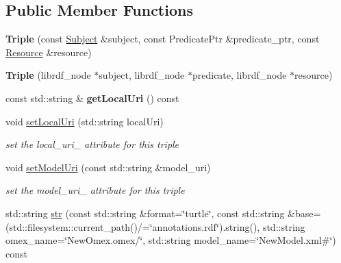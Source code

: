 \subsection*{Public Member Functions}
\begin{DoxyCompactItemize}
\item 
\mbox{\label{classomexmeta_1_1Triple_aaed857f9356dc3a7414f06f393a75ba0}} 
{\bfseries Triple} (const \hyperlink{classomexmeta_1_1Subject}{Subject} \&subject, const Predicate\+Ptr \&predicate\+\_\+ptr, const \hyperlink{classomexmeta_1_1Resource}{Resource} \&resource)
\item 
\mbox{\label{classomexmeta_1_1Triple_adc457c78ec059eb71602e7ea4f763582}} 
{\bfseries Triple} (librdf\+\_\+node $\ast$subject, librdf\+\_\+node $\ast$predicate, librdf\+\_\+node $\ast$resource)
\item 
\mbox{\label{classomexmeta_1_1Triple_a1cb45dd3a5778f0e0e92e4a185da9400}} 
const std\+::string \& {\bfseries get\+Local\+Uri} () const
\item 
\mbox{\label{classomexmeta_1_1Triple_a6694daa46597ea91dda045aa0d5e6cfc}} 
void \hyperlink{classomexmeta_1_1Triple_a6694daa46597ea91dda045aa0d5e6cfc}{set\+Local\+Uri} (std\+::string local\+Uri)
\begin{DoxyCompactList}\small\item\em set the local\+\_\+uri\+\_\+ attribute for this triple \end{DoxyCompactList}\item 
\mbox{\label{classomexmeta_1_1Triple_afd918ecccfa23079d9cb70f2e1a3e9b0}} 
void \hyperlink{classomexmeta_1_1Triple_afd918ecccfa23079d9cb70f2e1a3e9b0}{set\+Model\+Uri} (const std\+::string \&model\+\_\+uri)
\begin{DoxyCompactList}\small\item\em set the model\+\_\+uri\+\_\+ attribute for this triple \end{DoxyCompactList}\item 
std\+::string \hyperlink{classomexmeta_1_1Triple_aabfef726172656b6c61c602b4d8d33e5}{str} (const std\+::string \&format=\char`\"{}turtle\char`\"{}, const std\+::string \&base=(std\+::filesystem\+::current\+\_\+path()/=\char`\"{}annotations.\+rdf\char`\"{}).string(), std\+::string omex\+\_\+name=\char`\"{}New\+Omex.\+omex/\char`\"{}, std\+::string model\+\_\+name=\char`\"{}New\+Model.\+xml\#\char`\"{}) const

\end{DoxyCompactItemize}
